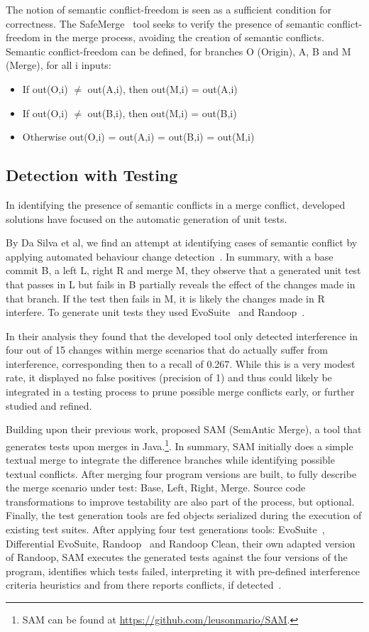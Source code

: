 The notion of semantic conflict-freedom is seen as a sufficient condition for correctness. The SafeMerge~\cite{kn:safemerge} tool seeks to verify the presence of semantic conflict-freedom in the merge process, avoiding the creation of semantic conflicts. Semantic conflict-freedom can be defined, for branches O (Origin), A, B and M (Merge), for all i inputs:
\begin{itemize}
  \item If out(O,i) $\neq$ out(A,i), then out(M,i) = out(A,i)
  \item If out(O,i) $\neq$ out(B,i), then out(M,i) = out(B,i)
  \item Otherwise out(O,i) = out(A,i) = out(B,i) = out(M,i)
\end{itemize}

\subsection{Detection with Testing}

In identifying the presence of semantic conflicts in a merge conflict, developed solutions have focused on the automatic generation of unit tests.

By Da Silva et al, we find an attempt at identifying cases of semantic conflict by applying automated behaviour change detection~\cite{kn:leuson}. In summary, with a base commit B, a left L, right R and merge M, they observe that a generated unit test that passes in L but fails in B partially reveals the effect of the changes made in that branch. If the test then fails in M, it is likely the changes made in R interfere. To generate unit tests they used EvoSuite~\cite{kn:evosuite} and Randoop~\cite{kn:randoop}.

In their analysis they found that the developed tool only detected interference in four out of 15 changes within merge scenarios that do actually suffer from interference, corresponding then to a recall of 0.267. While this is a very modest rate, it displayed no false positives (precision of 1) and thus could likely be integrated in a testing process to prune possible merge conflicts early, or further studied and refined.

 Building upon their previous work, \citet{kn:leuson2} proposed SAM (SemAntic Merge), a tool that generates tests upon merges in Java.\footnote{SAM can be found at \url{https://github.com/leusonmario/SAM}.}. In summary, SAM initially does a simple textual merge to integrate the difference branches while identifying possible textual conflicts. After merging four program versions are built, to fully describe the merge scenario under test: Base, Left, Right, Merge. Source code transformations to improve testability are also part of the process, but optional. Finally, the test generation tools are fed objects serialized during the execution of existing test suites. After applying four test generations tools: EvoSuite~\cite{kn:evosuite}, Differential EvoSuite, Randoop~\cite{kn:randoop} and Randoop Clean, their own adapted version of Randoop, SAM executes the generated tests against the four versions of the program, identifies which tests failed, interpreting it with pre-defined interference criteria heuristics and from there reports conflicts, if detected~\cite{kn:leuson2}.

